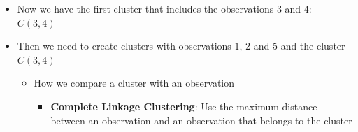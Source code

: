 \documentclass[
  ignorenonframetext,
]{beamer}
\providecommand{\tightlist}{%
  \setlength{\itemsep}{0pt}\setlength{\parskip}{0pt}}\usepackage{longtable,booktabs,array}
\begin{document}
\begin{frame}{}
\label{section-24}
\begin{itemize}
\item
  Now we have the first cluster that includes the observations \(3\) and
  \(4\): \(C(3,4)\)
\item
  Then we need to create clusters with observations \(1\), \(2\) and
  \(5\) and the cluster \(C(3,4)\)

  \begin{itemize}
  \item
    How we compare a cluster with an observation

    \begin{itemize}
    \tightlist
    \item
      \textbf{Complete Linkage Clustering}: Use the maximum distance
      between an observation and an observation that belongs to the
      cluster
    \end{itemize}
  \end{itemize}
\end{itemize}
\end{frame}
\end{document}
